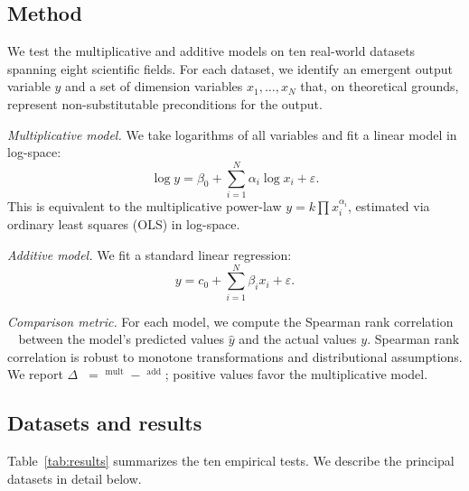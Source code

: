 \documentclass[12pt, a4paper]{article}
\theoremstyle{definition}
\theoremstyle{remark}
\DeclareMathOperator{\Spearman}{\rho_s}
\begin{document}
\subsection{Method}\label{sec:method}

We test the multiplicative and additive models on ten real-world datasets spanning eight scientific fields. For each dataset, we identify an emergent output variable $y$ and a set of dimension variables $x_1, \ldots, x_N$ that, on theoretical grounds, represent non-substitutable preconditions for the output.

\textit{Multiplicative model.} We take logarithms of all variables and fit a linear model in log-space:
\begin{equation}\label{eq:logmodel}
\log y = \beta_0 + \sum_{i=1}^{N} \alpha_i \log x_i + \varepsilon.
\end{equation}
This is equivalent to the multiplicative power-law $y = k \prod x_i^{\alpha_i}$, estimated via ordinary least squares (OLS) in log-space.

\textit{Additive model.} We fit a standard linear regression:
\begin{equation}\label{eq:linmodel}
y = c_0 + \sum_{i=1}^{N} \beta_i x_i + \varepsilon.
\end{equation}

\textit{Comparison metric.} For each model, we compute the Spearman rank correlation $\Spearman$ between the model's predicted values $\hat{y}$ and the actual values $y$. Spearman rank correlation is robust to monotone transformations and distributional assumptions. We report $\Delta\Spearman = \Spearman^{\text{mult}} - \Spearman^{\text{add}}$; positive values favor the multiplicative model.

\subsection{Datasets and results}

Table~\ref{tab:results} summarizes the ten empirical tests. We describe the principal datasets in detail below.
\end{document}
